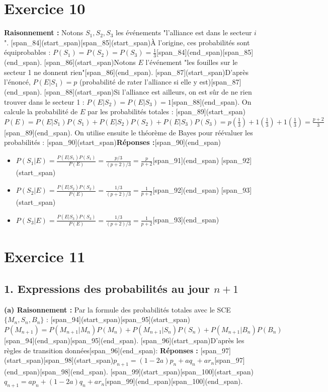 \documentclass[11pt,a4paper]{article}
\begin{document}
\hrulefill

\section*{Exercice 10}
\textbf{Raisonnement :} Notons $S_1, S_2, S_3$ les événements "l'alliance est dans le secteur $i$". [span_84](start_span)[span_85](start_span)À l'origine, ces probabilités sont équiprobables : $P(S_1) = P(S_2) = P(S_3) = \frac{1}{3}$[span_84](end_span)[span_85](end_span).
[span_86](start_span)Notons $E$ l'événement "les fouilles sur le secteur 1 ne donnent rien"[span_86](end_span).
[span_87](start_span)D'après l'énoncé, $P(E|S_1) = p$ (probabilité de rater l'alliance si elle y est)[span_87](end_span). [span_88](start_span)Si l'alliance est ailleurs, on est sûr de ne rien trouver dans le secteur 1 : $P(E|S_2) = P(E|S_3) = 1$[span_88](end_span).
On calcule la probabilité de $E$ par les probabilités totales :
[span_89](start_span)$P(E) = P(E|S_1)P(S_1) + P(E|S_2)P(S_2) + P(E|S_3)P(S_3) = p(\frac{1}{3}) + 1(\frac{1}{3}) + 1(\frac{1}{3}) = \frac{p+2}{3}$[span_89](end_span).
On utilise ensuite le théorème de Bayes pour réévaluer les probabilités :
[span_90](start_span)\textbf{Réponses :}[span_90](end_span)
\begin{itemize}
    [span_91](start_span)\item $P(S_1|E) = \frac{P(E|S_1)P(S_1)}{P(E)} = \frac{p/3}{(p+2)/3} = \frac{p}{p+2}$[span_91](end_span)
    [span_92](start_span)\item $P(S_2|E) = \frac{P(E|S_2)P(S_2)}{P(E)} = \frac{1/3}{(p+2)/3} = \frac{1}{p+2}$[span_92](end_span)
    [span_93](start_span)\item $P(S_3|E) = \frac{P(E|S_3)P(S_3)}{P(E)} = \frac{1/3}{(p+2)/3} = \frac{1}{p+2}$[span_93](end_span)
\end{itemize}

\hrulefill

\section*{Exercice 11}
\subsection*{1. Expressions des probabilités au jour $n+1$}
\textbf{(a) Raisonnement :} Par la formule des probabilités totales avec le SCE $\{M_n, S_n, B_n\}$ :
[span_94](start_span)[span_95](start_span)$P(M_{n+1}) = P(M_{n+1}|M_n)P(M_n) + P(M_{n+1}|S_n)P(S_n) + P(M_{n+1}|B_n)P(B_n)$[span_94](end_span)[span_95](end_span).
[span_96](start_span)D'après les règles de transition données[span_96](end_span):
\textbf{Réponses :}
[span_97](start_span)[span_98](start_span)$p_{n+1} = (1-2a)p_n + a q_n + a r_n$[span_97](end_span)[span_98](end_span).
[span_99](start_span)[span_100](start_span)$q_{n+1} = a p_n + (1-2a)q_n + a r_n$[span_99](end_span)[span_100](end_span).
\end{document}
